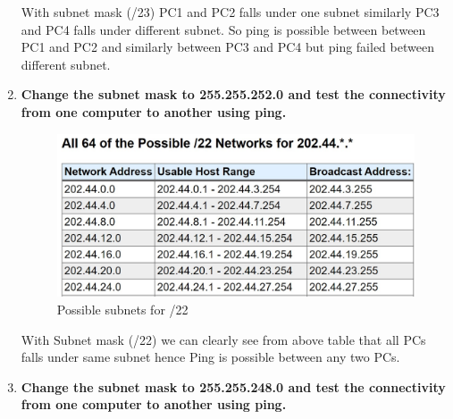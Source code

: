 \documentclass[a4paper,11pt]{article}
\begin{document}
\begin{enumerate}
          With subnet mask (/23) PC1 and PC2 falls under one subnet similarly PC3 and PC4 falls under different subnet. So ping is possible between between PC1 and PC2 and similarly between PC3 and PC4 but ping failed between different subnet.

    \item \textbf{ Change the subnet mask to 255.255.252.0 and test the connectivity from one computer to
              another using ping.}




          \begin{figure}[H]
              \centering
              \includegraphics[scale=0.58,cframe=blue 0.5pt 3pt]{./FIG/C22.jpg}
              \caption{Possible subnets for /22 }
          \end{figure}


          With Subnet mask (/22) we can clearly see from above table that all PCs falls under same subnet hence Ping is possible between any two PCs.



    \item \textbf{ Change the subnet mask to 255.255.248.0 and test the connectivity from one computer to
              another using ping.}



\end{enumerate}
\end{document}
